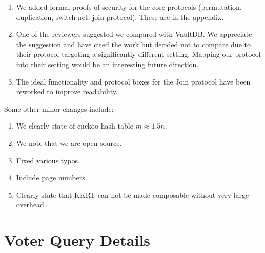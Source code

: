 \documentclass[11pt,letterpaper]{article}
\begin{document}
\begin{enumerate}
	\item We added formal proofs of security for the core protocols (permutation, duplication, switch net, join protocol). These are in the appendix. 
	
	\item 
	One of the reviewers suggested we compared with VaultDB. We appreciate the suggestion and have cited the work but decided not to compare due to their protocol targeting a significantly different setting. Mapping our protocol into their setting would be an interesting future direction. 
	
	\item The ideal functionality and protocol boxes for the Join protocol have been reworked to improve readability. 
\end{enumerate}

Some other minor changes include:
\begin{enumerate}
	\item  We clearly state of cuckoo hash table $m\approx1.5n$.
	\item  We note that we are open source. 
	\item  Fixed various typos.
	\item  Include page numbers.
	\item  Clearly state that KKRT can not be made composable without very large overhead. 
\end{enumerate}
\color{black}

\section{Voter Query Details}\label{sec:voterDetails}
\end{document}
